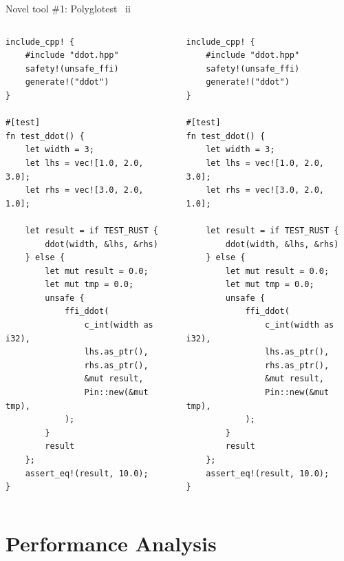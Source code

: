 \documentclass[10pt,aspectratio=169]{beamer}
\begin{document}
\begin{frame}[fragile]{Novel tool \#1: Polyglotest \ ii}
        \begin{columns}[T,onlytextwidth]
            \centering
            \begin{verbatim}
include_cpp! {
    #include "ddot.hpp"
    safety!(unsafe_ffi)
    generate!("ddot")
}

#[test]
fn test_ddot() {
    let width = 3;
    let lhs = vec![1.0, 2.0, 3.0];
    let rhs = vec![3.0, 2.0, 1.0];

    let result = if TEST_RUST {
        ddot(width, &lhs, &rhs)
    } else {
        let mut result = 0.0;
        let mut tmp = 0.0;
        unsafe {
            ffi_ddot(
                c_int(width as i32),
                lhs.as_ptr(),
                rhs.as_ptr(),
                &mut result,
                Pin::new(&mut tmp),
            );
        }
        result
    };
    assert_eq!(result, 10.0);
}
            \end{verbatim}
            \begin{verbatim}
include_cpp! {
    #include "ddot.hpp"
    safety!(unsafe_ffi)
    generate!("ddot")
}

#[test]
fn test_ddot() {
    let width = 3;
    let lhs = vec![1.0, 2.0, 3.0];
    let rhs = vec![3.0, 2.0, 1.0];

    let result = if TEST_RUST {
        ddot(width, &lhs, &rhs)
    } else {
        let mut result = 0.0;
        let mut tmp = 0.0;
        unsafe {
            ffi_ddot(
                c_int(width as i32),
                lhs.as_ptr(),
                rhs.as_ptr(),
                &mut result,
                Pin::new(&mut tmp),
            );
        }
        result
    };
    assert_eq!(result, 10.0);
}
            \end{verbatim}
        \end{columns}
\end{frame}




\section{Performance Analysis}
\end{document}
